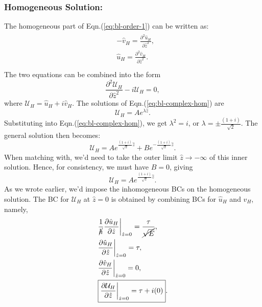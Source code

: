\documentclass{article}
\newcommand{\pd}[2]{\frac{\partial{#1}}{\partial{#2}}}
\newcommand{\pdd}[2]{\frac{\partial^2{#1}}{\partial{#2}^2}}
\begin{document}
\subsubsection{Homogeneous Solution:}
The homogeneous part of Eqn.(\ref{eq:bl-order-1}) can be written as:
\begin{align}
 \begin{split}
  & -\hat{v}_{H} = \pdd{\hat{u}_{H}}{\hat{z} },\\
  &\hat{u}_{H} = \pdd{\hat{v}_{H}}{\hat{z} }.\\
 \end{split}
\end{align}
%
The two equations can be combined into the form
\begin{equation}\label{eq:bl-complex-hom}
\pdd{\mathcal{U}_{H}}{\hat{z}} - i \mathcal{U}_{H} = 0,
\end{equation}
where $ \mathcal{U}_{H} = \hat{u}_{H} + i \hat{v}_{H}$. The solutions of Eqn.(\ref{eq:bl-complex-hom}) are 
\begin{equation}
 \mathcal{U}_{H} = A e^{\lambda \hat{z}}.
\end{equation}
%
Substituting into Eqn.(\ref{eq:bl-complex-hom}), we get $\lambda^{2} = i$, or $\lambda = \pm \frac{(1+i)}{\sqrt{2}}$. The general solution then becomes:
\begin{equation}\label{eq:bl-complex-hom-gen-soln}
 \mathcal{U}_{H} = A e^{\frac{(1+i)}{\sqrt{2}}\hat{z}} + B e^{-\frac{(1+i)}{\sqrt{2}}\hat{z}}.
\end{equation}
%
When matching with, we'd need to take the outer limit $\hat{z}\rightarrow -\infty$ of this inner solution. Hence, for consistency, we must have $\boxed{B = 0}$, giving 
%
\begin{equation}\label{eq:bl-complex-hom-upper}
 \mathcal{U}_{H} = A e^{\frac{(1+i)}{\sqrt{2}}\hat{z}}.
\end{equation}
As we wrote earlier, we'd impose the inhomogeneous BCs on the homogeneous solution. The BC for $\mathcal{U}_{H}$ at $\hat{z} = 0$ is obtained by combining BCs for $\hat{u}_{H}$ and $\hat{v}_{H}$, namely,
\begin{align}\label{eq:bl-complex-hom-upper-bc}
 \begin{split}
  &\frac{1}{\cancel{h} }\pd{\hat{u}_{H}}{\hat{z}}\bigg|_{\hat{z} = 0} = \frac{\tau}{\cancel{\sqrt{E} }},\\
  & \pd{\hat{u}_{H}}{\hat{z}}\bigg|_{\hat{z} = 0} = \tau, \\
  &\pd{\hat{v}_{H}}{\hat{z}}\bigg|_{\hat{z} = 0} = 0,\\
  &\boxed{\pd{\mathcal{U}_{H}}{\hat{z}}\bigg|_{\hat{z} = 0} = \tau + i(0) }.\\
 \end{split}
\end{align}
\end{document}
